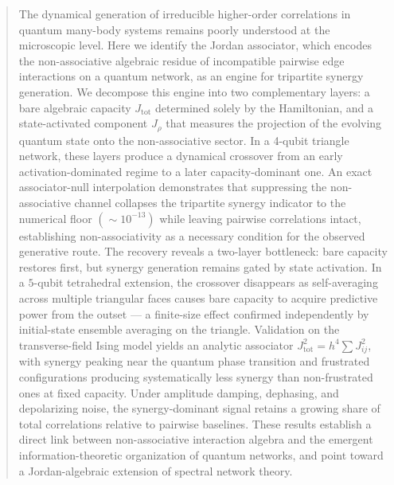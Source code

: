 \documentclass[aps,physrev,preprint,groupedaddress]{revtex4-2}
\begin{document}
\begin{abstract}
The dynamical generation of irreducible higher-order correlations in quantum many-body systems remains poorly understood at the microscopic level. Here we identify the Jordan associator, which encodes the non-associative algebraic residue of incompatible pairwise edge interactions on a quantum network, as an engine for tripartite synergy generation. We decompose this engine into two complementary layers: a bare algebraic capacity $J_{\mathrm{tot}}$ determined solely by the Hamiltonian, and a state-activated component $J_\rho$ that measures the projection of the evolving quantum state onto the non-associative sector. In a 4-qubit triangle network, these layers produce a dynamical crossover from an early activation-dominated regime to a later capacity-dominant one. An exact associator-null interpolation demonstrates that suppressing the non-associative channel collapses the tripartite synergy indicator to the numerical floor $(\sim\!10^{-13})$ while leaving pairwise correlations intact, establishing non-associativity as a necessary condition for the observed generative route. The recovery reveals a two-layer bottleneck: bare capacity restores first, but synergy generation remains gated by state activation. In a $5$-qubit tetrahedral extension, the crossover disappears as self-averaging across multiple triangular faces causes bare capacity to acquire predictive power from the outset — a finite-size effect confirmed independently by initial-state ensemble averaging on the triangle. Validation on the transverse-field Ising model yields an analytic associator $J_{\mathrm{tot}}^2 = h^4 \sum J_{ij}^2$, with synergy peaking near the quantum phase transition and frustrated configurations producing systematically less synergy than non-frustrated ones at fixed capacity. Under amplitude damping, dephasing, and depolarizing noise, the synergy-dominant signal retains a growing share of total correlations relative to pairwise baselines. These results establish a direct link between non-associative interaction algebra and the emergent information-theoretic organization of quantum networks, and point toward a Jordan-algebraic extension of spectral network theory.
\end{abstract}


\maketitle
\end{document}
